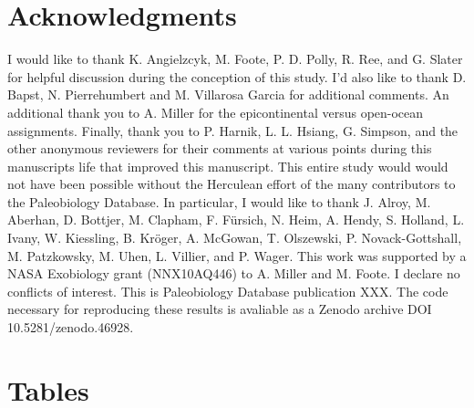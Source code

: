 \documentclass[11pt]{article}
\begin{document}
\section*{Acknowledgments}

I would like to thank K. Angielzcyk, M. Foote, P. D. Polly, R. Ree, and G. Slater for helpful discussion during the conception of this study. I'd also like to thank D. Bapst, N. Pierrehumbert and M. Villarosa Garcia for additional comments. An additional thank you to  A. Miller for the epicontinental versus open-ocean assignments. Finally, thank you to P. Harnik, L. L. Hsiang, G. Simpson, and the other anonymous reviewers for their comments at various points during this manuscripts life that improved this manuscript. This entire study would would not have been possible without the Herculean effort of the many contributors to the Paleobiology Database. In particular, I would like to thank J. Alroy, M. Aberhan, D. Bottjer, M. Clapham, F. F\"{u}rsich, N. Heim, A. Hendy, S. Holland, L. Ivany, W. Kiessling, B. Kr\"{o}ger, A. McGowan, T. Olszewski, P. Novack-Gottshall, M. Patzkowsky, M. Uhen, L. Villier, and P. Wager. This work was supported by a NASA Exobiology grant (NNX10AQ446) to A. Miller and M. Foote. I declare no conflicts of interest. This is Paleobiology Database publication XXX. The code necessary for reproducing these results is avaliable as a Zenodo archive DOI 10.5281/zenodo.46928.

\newpage{}





\newpage

\section*{Tables}
\renewcommand{\thetable}{\arabic{table}}
\setcounter{table}{0}
\end{document}
